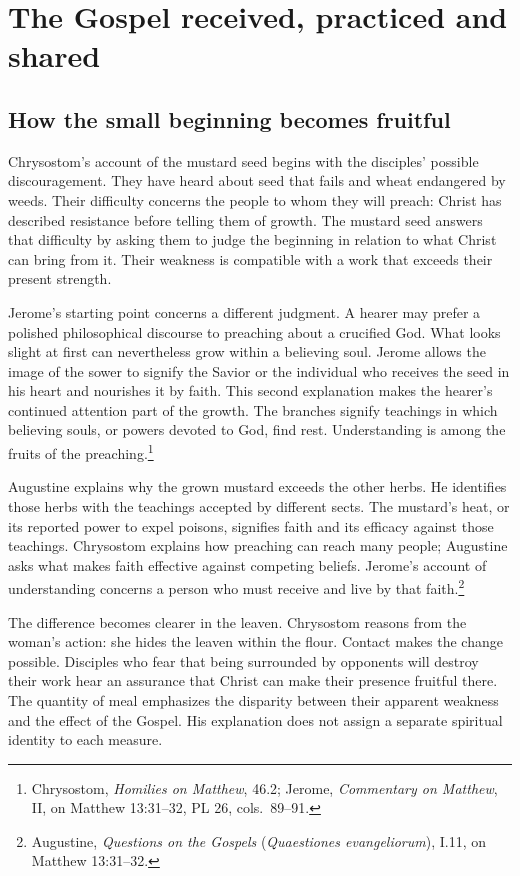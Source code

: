 \section{The Gospel received, practiced and shared}

\subsection{How the small beginning becomes fruitful}

Chrysostom's account of the mustard seed begins with the disciples' possible discouragement. They have heard about seed that fails and wheat endangered by weeds. Their difficulty concerns the people to whom they will preach: Christ has described resistance before telling them of growth. The mustard seed answers that difficulty by asking them to judge the beginning in relation to what Christ can bring from it. Their weakness is compatible with a work that exceeds their present strength.

Jerome's starting point concerns a different judgment. A hearer may prefer a polished philosophical discourse to preaching about a crucified God. What looks slight at first can nevertheless grow within a believing soul. Jerome allows the image of the sower to signify the Savior or the individual who receives the seed in his heart and nourishes it by faith. This second explanation makes the hearer's continued attention part of the growth. The branches signify teachings in which believing souls, or powers devoted to God, find rest. Understanding is among the fruits of the preaching.\footnote{Chrysostom, \textit{Homilies on Matthew}, 46.2; Jerome, \textit{Commentary on Matthew}, II, on Matthew 13:31--32, PL 26, cols.~89--91.}

Augustine explains why the grown mustard exceeds the other herbs. He identifies those herbs with the teachings accepted by different sects. The mustard's heat, or its reported power to expel poisons, signifies faith and its efficacy against those teachings. Chrysostom explains how preaching can reach many people; Augustine asks what makes faith effective against competing beliefs. Jerome's account of understanding concerns a person who must receive and live by that faith.\footnote{Augustine, \textit{Questions on the Gospels} (\textit{Quaestiones evangeliorum}), I.11, on Matthew 13:31--32.}

The difference becomes clearer in the leaven. Chrysostom reasons from the woman's action: she hides the leaven within the flour. Contact makes the change possible. Disciples who fear that being surrounded by opponents will destroy their work hear an assurance that Christ can make their presence fruitful there. The quantity of meal emphasizes the disparity between their apparent weakness and the effect of the Gospel. His explanation does not assign a separate spiritual identity to each measure.

